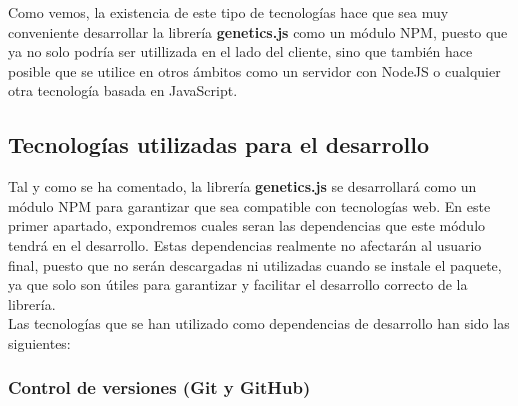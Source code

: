 Como vemos, la existencia de este tipo de tecnologías hace que sea muy conveniente desarrollar la librería \textbf{genetics.js} como un módulo NPM, puesto que ya no solo podría ser utillizada en el lado del cliente, sino que también hace posible que se utilice en otros ámbitos como un servidor con NodeJS o cualquier otra tecnología basada en JavaScript.

\subsection{Tecnologías utilizadas para el desarrollo}

Tal y como se ha comentado, la librería \textbf{genetics.js} se desarrollará como un módulo NPM para garantizar que sea compatible con tecnologías web. En este primer apartado, expondremos cuales seran las dependencias que este módulo tendrá en el desarrollo. Estas dependencias realmente no afectarán al usuario final, puesto que no serán descargadas ni utilizadas cuando se instale el paquete, ya que solo son útiles para garantizar y facilitar el desarrollo correcto de la librería. \\

Las tecnologías que se han utilizado como dependencias de desarrollo han sido las siguientes:

\subsubsection{Control de versiones (Git y GitHub)}

